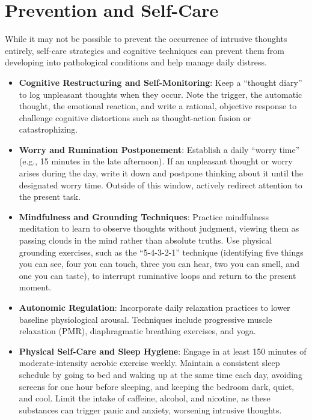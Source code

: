\section*{Prevention and Self-Care}
While it may not be possible to prevent the occurrence of intrusive thoughts entirely, self-care strategies and cognitive techniques can prevent them from developing into pathological conditions and help manage daily distress.
\begin{itemize}
  \item \textbf{Cognitive Restructuring and Self-Monitoring}: Keep a ``thought diary'' to log unpleasant thoughts when they occur. Note the trigger, the automatic thought, the emotional reaction, and write a rational, objective response to challenge cognitive distortions such as thought-action fusion or catastrophizing.
  \item \textbf{Worry and Rumination Postponement}: Establish a daily ``worry time'' (e.g., 15 minutes in the late afternoon). If an unpleasant thought or worry arises during the day, write it down and postpone thinking about it until the designated worry time. Outside of this window, actively redirect attention to the present task.
  \item \textbf{Mindfulness and Grounding Techniques}: Practice mindfulness meditation to learn to observe thoughts without judgment, viewing them as passing clouds in the mind rather than absolute truths. Use physical grounding exercises, such as the ``5-4-3-2-1'' technique (identifying five things you can see, four you can touch, three you can hear, two you can smell, and one you can taste), to interrupt ruminative loops and return to the present moment.
  \item \textbf{Autonomic Regulation}: Incorporate daily relaxation practices to lower baseline physiological arousal. Techniques include progressive muscle relaxation (PMR), diaphragmatic breathing exercises, and yoga.
  \item \textbf{Physical Self-Care and Sleep Hygiene}: Engage in at least 150 minutes of moderate-intensity aerobic exercise weekly. Maintain a consistent sleep schedule by going to bed and waking up at the same time each day, avoiding screens for one hour before sleeping, and keeping the bedroom dark, quiet, and cool. Limit the intake of caffeine, alcohol, and nicotine, as these substances can trigger panic and anxiety, worsening intrusive thoughts.
\end{itemize}

